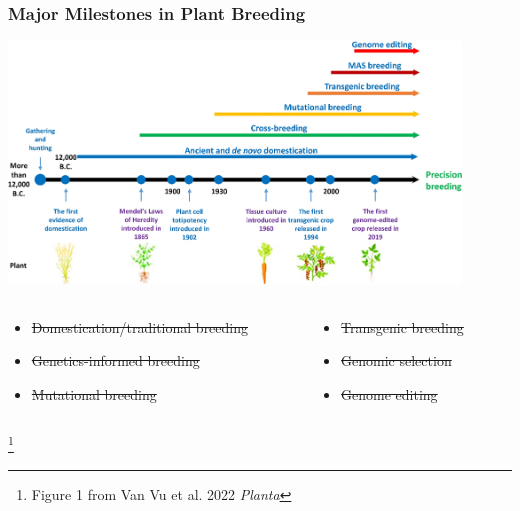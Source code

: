 \documentclass[xcolor=dvipsnames]{beamer}
\newcommand\blfootnote[1]{%
	\begingroup
	\renewcommand\thefootnote{}\footnote{#1}%
	\addtocounter{footnote}{-1}%
	\endgroup
}
\begin{document}
\begin{frame}
	\frametitle{Major Milestones in Plant Breeding}
	\centering	\includegraphics[keepaspectratio, width  = 0.9\textwidth]{img/timeLine}
	
	
	\begin{columns}
		\begin{column}{0.5\textwidth}
			\begin{itemize}
				\item[\textbf{1}] \st{Domestication/traditional breeding}
				\item[\textbf{2}] \st{Genetics-informed breeding}
				\item[\textbf{3}] \st{Mutational breeding}
			\end{itemize}
		\end{column}
		\begin{column}{0.5\textwidth}
			\begin{itemize}
				\item[\textbf{4}] \st{Transgenic breeding}
				\item[\textbf{5}] \st{Genomic selection} 
				\item[\textbf{6}] \st{Genome editing} 
				
			\end{itemize}
		\end{column}
	\end{columns}
	
	\blfootnote{Figure 1 from Van Vu et al. 2022 \textit{Planta}}
	
	
	
\end{frame}
\end{document}
